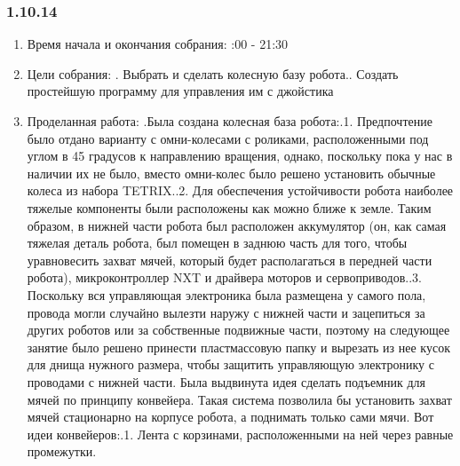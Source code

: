 \documentclass[11pt]{article}
\begin{document}
         \subsubsection{1.10.14}
         \begin{enumerate}
            \item Время начала и окончания собрания:
            :00 - 21:30
            \item Цели собрания:
            .   Выбрать и сделать колесную базу робота..   Создать простейшую программу для управления им с джойстика\newline
            \item Проделанная работа:
            .Была создана колесная база робота:.1.   Предпочтение было отдано варианту с омни-колесами с роликами, расположенными под углом в 45 градусов к направлению вращения, однако, поскольку пока у нас в наличии их не было, вместо омни-колес было решено установить обычные колеса из набора TETRIX..2.   Для обеспечения устойчивости робота наиболее тяжелые компоненты были расположены как можно ближе к земле. Таким образом, в нижней части робота был расположен аккумулятор (он, как самая тяжелая деталь робота, был помещен в заднюю часть для того, чтобы уравновесить захват мячей, который будет располагаться в передней части робота), микроконтроллер NXT и драйвера моторов и сервоприводов..3.   Поскольку вся управляющая электроника была размещена у самого пола, провода могли случайно вылезти наружу с нижней части и зацепиться за других роботов или за собственные подвижные части, поэтому на следующее занятие было решено принести пластмассовую папку и вырезать из нее кусок для днища нужного размера, чтобы защитить управляющую электронику с проводами с нижней части.   Была выдвинута идея сделать подъемник для мячей по принципу конвейера. Такая система позволила бы установить захват мячей стационарно на корпусе робота, а поднимать только сами мячи. Вот идеи конвейеров:.1.   Лента с корзинами, расположенными на ней через равные промежутки.\newline

\end{enumerate}
\end{document}
